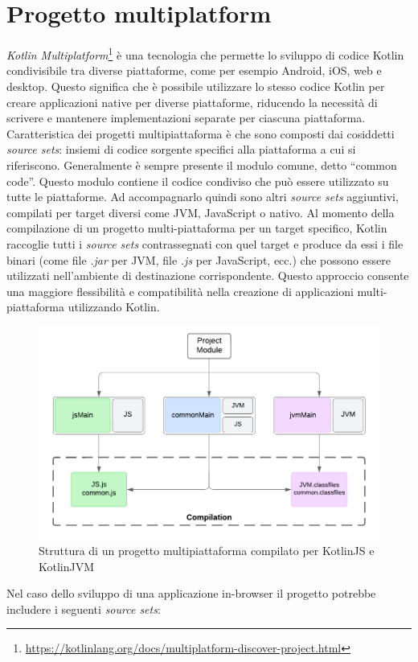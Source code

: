 \section{Progetto multiplatform}
\textit{Kotlin Multiplatform}\footnote{\url{https://kotlinlang.org/docs/multiplatform-discover-project.html}} è una tecnologia che permette lo sviluppo di codice Kotlin condivisibile tra diverse piattaforme, come per esempio Android, iOS, web e desktop. Questo significa che è possibile utilizzare lo stesso codice Kotlin per creare applicazioni native per diverse piattaforme, riducendo la necessità di scrivere e mantenere implementazioni separate per ciascuna piattaforma.
Caratteristica dei progetti multipiattaforma è che sono composti dai cosiddetti \textit{source sets}: insiemi di codice sorgente specifici alla piattaforma a cui si riferiscono. Generalmente è sempre presente il modulo comune, detto ``common code''. Questo modulo contiene il codice condiviso che può essere utilizzato su tutte le piattaforme. Ad accompagnarlo quindi sono altri \textit{source sets} aggiuntivi, compilati per target diversi come \ac{JVM}, JavaScript o nativo.  
Al momento della compilazione di un progetto multi-piattaforma per un target specifico, Kotlin raccoglie tutti i \textit{source sets} contrassegnati con quel target e produce da essi i file binari (come file \textit{.jar} per JVM, file \textit{.js} per JavaScript, ecc.) che possono essere utilizzati nell'ambiente di destinazione corrispondente.
Questo approccio consente una maggiore flessibilità e compatibilità nella creazione di applicazioni multi-piattaforma utilizzando Kotlin.
\begin{figure}
	\centering
	\includegraphics[width=.7\linewidth]{imgs/MPProject.pdf}
	\caption{Struttura di un progetto multipiattaforma compilato per KotlinJS e KotlinJVM}
	\label{fig:mpp-project}
\end{figure}
Nel caso dello sviluppo di una applicazione in-browser il progetto potrebbe includere i seguenti \textit{source sets}:
